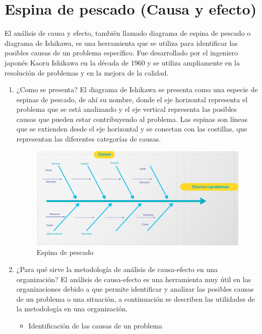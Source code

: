 \documentclass{article}
\theoremstyle{mytheoremstyle}
\theoremstyle{mytheoremstyle}
\theoremstyle{myproblemstyle}
\begin{document}
\section{Espina de pescado (Causa y efecto)}
El análisis de causa y efecto, también
llamado diagrama de espina de
pescado o diagrama de Ishikawa, es
una herramienta que se utiliza para
identificar las posibles causas de un
problema específico. Fue
desarrollado por el ingeniero japonés
Kaoru Ishikawa en la década de 1960
y se utiliza ampliamente en la
resolución de problemas y en la
mejora de la calidad.
\begin{enumerate}
	\item ¿Como se presenta?\newline
	El diagrama de Ishikawa se presenta
	como una especie de espinas de
	pescado, de ahí su nombre, donde el
	eje horizontal representa el problema
	que se está analizando y el eje vertical
	representa las posibles causas que
	pueden estar contribuyendo al
	problema. Las espinas son líneas que
	se extienden desde el eje horizontal y
	se conectan con las costillas, que
	representan las diferentes categorías
	de causas.   
		            \begin{figure}[H]
			            \centering
			            \includegraphics[width=1\textwidth]{espina.png}
			            \caption{Espina de pescado}
			            \label{fig:imagen2}
		            \end{figure}
	\item ¿Para qué sirve la
	metodología de análisis
	de causa-efecto en una
	organización?\newline
	El análisis de causa-efecto es una
	herramienta muy útil en las
	organizaciones debido a que permite
	identificar y analizar las posibles
	causas de un problema o una situación,
	a continuación se describen las
	utilidades de la metodología en una
	organización.
	      \begin{itemize}
			\newpage
		      \item Identiﬁcación de las causas de un problema\newline

\end{itemize}
\end{enumerate}
\end{document}
